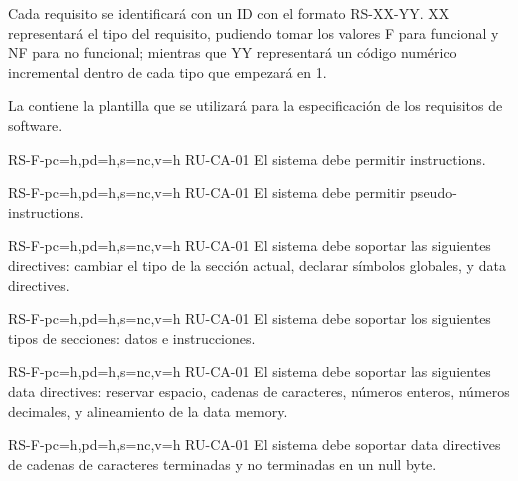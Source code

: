 Cada requisito se identificará con un ID con el formato RS-XX-YY. XX
representará el tipo del requisito, pudiendo tomar los valores F para funcional
y NF para no funcional; mientras que YY representará un código numérico incremental
dentro de cada tipo que empezará en 1.

La  contiene la plantilla que se utilizará para la
especificación de los requisitos de software.



\setcounter{i}{1}

\begin{softwareReq}{RS-F-}{pc=h,pd=h,s=nc,v=h}
    {RU-CA-01}
    El sistema debe permitir  \glspl{instruction}.
\end{softwareReq}

\begin{softwareReq}{RS-F-}{pc=h,pd=h,s=nc,v=h}
    {RU-CA-01}
    El sistema debe permitir  \glspl{pseudo-instruction}.
\end{softwareReq}

\begin{softwareReq}{RS-F-}{pc=h,pd=h,s=nc,v=h}
    {RU-CA-01}
    El sistema debe soportar las siguientes \glspl{directive}: cambiar el tipo
    de la sección actual, declarar símbolos globales, y \glspl{data directive}.
\end{softwareReq}

\begin{softwareReq}{RS-F-}{pc=h,pd=h,s=nc,v=h}
    {RU-CA-01}
    El sistema debe soportar los siguientes tipos de secciones: datos e
    instrucciones.
\end{softwareReq}

\begin{softwareReq}{RS-F-}{pc=h,pd=h,s=nc,v=h}
    {RU-CA-01}
    El sistema debe soportar las siguientes \glspl{data directive}: reservar
    espacio, cadenas de caracteres, números enteros, números decimales, y
    alineamiento de la \gls{data memory}.
\end{softwareReq}

\begin{softwareReq}{RS-F-}{pc=h,pd=h,s=nc,v=h}
    {RU-CA-01}
    El sistema debe soportar \glspl{data directive} de cadenas de
    caracteres terminadas y no terminadas en un \gls{null byte}.
\end{softwareReq}


